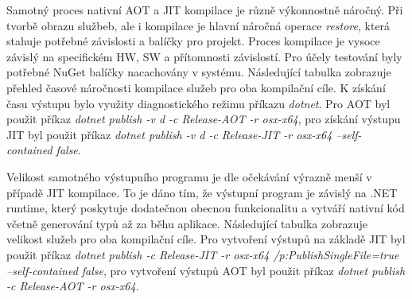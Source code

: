 
Samotný proces nativní AOT a JIT kompilace je různě výkonnostně náročný. Při tvorbě obrazu službeb, ale i kompilace je hlavní náročná operace \emph{restore}, která stahuje potřebné závislosti a balíčky pro projekt. Proces kompilace je vysoce závislý na specifickém HW, SW a přítomnosti závislostí. Pro účely testování byly potřebné NuGet balíčky nacachovány v systému. Následující tabulka zobrazuje přehled časové náročnosti kompilace služeb pro oba kompilační cíle. K získání času výstupu bylo využity diagnostického režimu příkazu \emph{dotnet}. Pro AOT byl použit příkaz \emph{dotnet publish -v d -c Release-AOT -r osx-x64}, pro získání výstupu JIT byl použit příkaz \emph{dotnet publish -v d -c Release-JIT -r osx-x64 --self-contained false}.



Velikost samotného výstupního programu je dle očekávání výrazně menší v případě JIT kompilace. To je dáno tím, že výstupní program je závislý na .NET runtime, který poskytuje dodatečnou obecnou funkcionalitu a vytváří nativní kód včetně generování typů až za běhu aplikace. Následující tabulka zobrazuje velikost služeb pro oba kompilační cíle. Pro vytvoření výstupů na základě JIT byl použit příkaz \emph{dotnet publish -c Release-JIT -r osx-x64 /p:PublishSingleFile=true --self-contained false}, pro vytvoření výstupů AOT byl použit příkaz \emph{dotnet publish -c Release-AOT -r osx-x64}.


